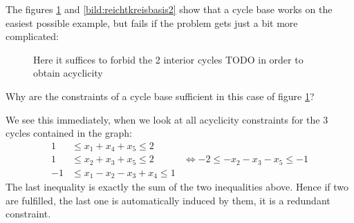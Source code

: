 The figures \ref{bild:reichtkreisbasis1} and \ref{bild:reichtkreisbasis2} %
show that a cycle base works on the easiest possible example, but fails if the problem gets just a bit more complicated:

\begin{figure}[h!]
\centering
{}
\caption{Here it suffices to forbid the 2 interior cycles TODO in order to obtain acyclicity}
 \label{bild:reichtkreisbasis1}
\end{figure}

Why are the constraints of a cycle base sufficient in this case of figure \ref{bild:reichtkreisbasis1}? 

We see this immediately, when we look at all acyclicity constraints for the 3 cycles contained in the graph:
\begin{align*}
 1 &\le x_1+x_4+x_5\le 2&\\
 1&\le x_2+x_3+x_5\le 2& \iff -2\le -x_2-x_3-x_5\le -1\\
 -1 &\le x_1-x_2-x_3+x_4 \le 1&
\end{align*}
The last inequality is exactly the sum of the two inequalities above. Hence if two are fulfilled, the last one is 
automatically induced by them, it is a redundant constraint.

